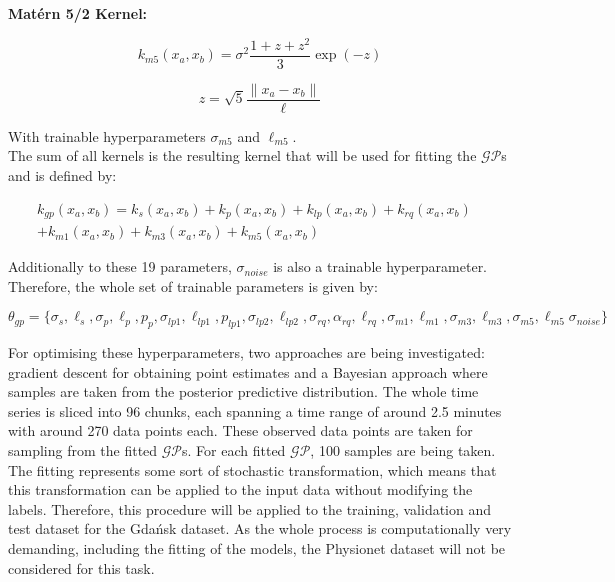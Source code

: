 \documentclass[11pt]{scrartcl}
\begin{document}
\textbf{Matérn 5/2 Kernel:}

\begin{equation}
    k_{m5}(x_a, x_b) = \sigma^2 \frac{1 + z + z^2}{3} \exp{(-z)}
\end{equation}

\begin{equation}
    z = \sqrt{5} \frac{\|x_a - x_b\|}{\ell}
\end{equation}

With trainable hyperparameters $\sigma_{m5}$ and $\ell_{m5}$. \\

The sum of all kernels is the resulting kernel that will be used for fitting the $\mathcal{GP}$s and is defined by:

\begin{equation}
\begin{split}
    k_{gp}(x_a, x_b) = k_s(x_a, x_b) + k_p(x_a, x_b) + k_{lp}(x_a, x_b) + k_{rq}(x_a, x_b) & \\
     + k_{m1}(x_a, x_b) + k_{m3}(x_a, x_b) + k_{m5}(x_a, x_b)
\end{split}
\end{equation}

Additionally to these 19 parameters, $\sigma_{noise}$ is also a trainable hyperparameter. Therefore, the whole set of trainable parameters is given by:

\begin{equation}
    \theta_{gp} = \{ \sigma_s, \ell_s, \sigma_p, \ell_p, p_p, \sigma_{lp1}, \ell_{lp1}, p_{lp1}, \sigma_{lp2}, \ell_{lp2}, \sigma_{rq}, \alpha_{rq}, \ell_{rq}, \sigma_{m1}, \ell_{m1}, \sigma_{m3}, \ell_{m3}, \sigma_{m5}, \ell_{m5}  \sigma_{noise} \}
\end{equation}

For optimising these hyperparameters, two approaches are being investigated: gradient descent for obtaining point estimates and a Bayesian approach where samples are taken from the posterior predictive distribution. The whole time series is sliced into 96 chunks, each spanning a time range of around 2.5 minutes with around 270 data points each. These observed data points are taken for sampling from the fitted $\mathcal{GP}$s. For each fitted $\mathcal{GP}$, 100 samples are being taken. The fitting represents some sort of stochastic transformation, which means that this transformation can be applied to the input data without modifying the labels. Therefore, this procedure will be applied to the training, validation and test dataset for the Gdańsk dataset. As the whole process is computationally very demanding, including the fitting of the models, the Physionet dataset will not be considered for this task.
\end{document}
